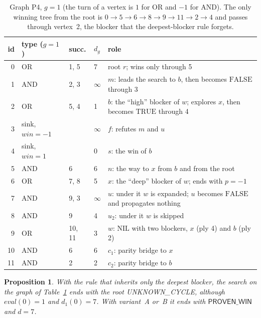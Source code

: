 \documentclass{article}
\theoremstyle{plain}
\newtheorem{proposition}[theorem]{Proposition}
\theoremstyle{definition}
\theoremstyle{remark}
\newcommand{\eval}{\mathit{eval}}
\newcommand{\win}{\mathit{win}}
\newcommand{\TRUE}{\ensuremath{\mathrm{TRUE}}}
\newcommand{\FALSE}{\ensuremath{\mathrm{FALSE}}}
\newcommand{\NIL}{\ensuremath{\mathrm{NIL}}}
\newcommand{\PW}{\textsf{PROVEN\_WIN}}
\newcommand{\UC}{\textsf{UNKNOWN\_CYCLE}}
\begin{document}
\begin{table}[h]\centering\footnotesize\setlength{\tabcolsep}{4pt}
\begin{tabular}{rlllp{5.7cm}}
\toprule
id & type ($g = 1$) & succ. & $d_g$ & role \\
\midrule
0 & OR & 1, 5 & 7 & root $r$; wins only through 5 \\
1 & AND & 2, 3 & $\infty$ & $m$: leads the search to $b$, then becomes \FALSE{} through 3 \\
2 & OR & 5, 4 & 1 & $b$: the ``high'' blocker of $w$; explores $x$, then becomes \TRUE{} through 4 \\
3 & sink, $\win = -1$ & & $\infty$ & $f$: refutes $m$ and $u$ \\
4 & sink, $\win = 1$ & & 0 & $s$: the win of $b$ \\
5 & AND & 6 & 6 & $n$: the way to $x$ from $b$ and from the root \\
6 & OR & 7, 8 & 5 & $x$: the ``deep'' blocker of $w$; ends with $p = -1$ \\
7 & AND & 9, 3 & $\infty$ & $u$: under it $w$ is expanded; $u$ becomes \FALSE{} and propagates nothing \\
8 & AND & 9 & 4 & $u_2$: under it $w$ is skipped \\
9 & OR & 10, 11 & 3 & $w$: \NIL{} with two blockers, $x$ (ply 4) and $b$ (ply 2) \\
10 & AND & 6 & 6 & $c_1$: parity bridge to $x$ \\
11 & AND & 2 & 2 & $c_2$: parity bridge to $b$ \\
\bottomrule
\end{tabular}
\caption{Graph P4, $g = 1$ (the turn of a vertex is $1$ for OR and $-1$ for AND). The only winning tree from the root is $0 \to 5 \to 6 \to 8 \to 9 \to 11 \to 2 \to 4$ and passes through vertex~2, the blocker that the deepest-blocker rule forgets.}
\label{tab:p4}
\end{table}

\begin{proposition}\label{prop:p4}
With the rule that inherits only the deepest blocker, the search on the graph of Table~\ref{tab:p4} ends with the root \UC{}, although $\eval(0) = 1$ and $d_1(0) = 7$. With variant~A or~B it ends with $\PW$ and $d = 7$.
\end{proposition}
\end{document}
